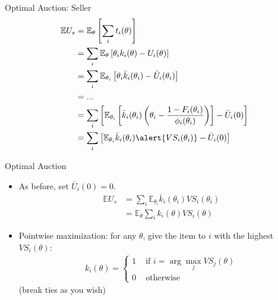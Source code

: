 \documentclass[english,10pt
,aspectratio=169
]{beamer}
\begin{document}
\begin{frame}{Optimal Auction: Seller}
\begin{align*}
	\mathbb{E} U_s &= \mathbb{E}_\theta \left[ \sum_i t_i(\theta) \right]
	\\ &= \sum_i \mathbb{E}_{\theta} \left[ \theta_i k_i(\theta) - U_i(\theta) \right]
	\\ &= \sum_i \mathbb{E}_{\theta_i} \left[ \theta_i \bar{k}_i(\theta_i) - \bar{U}_i(\theta_i) \right]
	\\  &= ...
	\\ &= \sum_i \left[ \mathbb{E}_{\theta_i} \left[ \bar{k}_i(\theta_i) \left( \theta_i - \frac{1-F_i(\theta_i)}{\phi_i(\theta_i)} \right) \right] - \bar{U}_i(0)\right]
	\\ &= \sum_i \left[ \mathbb{E}_{\theta_i} \bar{k}_i(\theta_i) \alert{VS_i(\theta_i)} - \bar{U}_i(0) \right]
\end{align*}
\end{frame}


\begin{frame}{Optimal Auction}
\begin{itemize}
	\item As before, set $\bar{U}_i(0) = 0$.
	{\footnotesize
		\begin{align*}
			\mathbb{E} U_s &= \sum_i \mathbb{E}_{\theta_i} \bar{k}_i(\theta_i) VS_i(\theta_i)
			\\
			&= \mathbb{E}_{\theta} \sum_i k_i(\theta) VS_i(\theta)
		\end{align*}
	}
	\item Pointwise maximization: for any $\theta$, give the item to $i$ with the highest $VS_i(\theta)$:
	\begin{align*}
		k_i(\theta) = 
		\begin{cases}
			1 & \text{ if } i = \arg \max_j VS_j(\theta)
			\\
			0 & \text { otherwise}
		\end{cases}
	\end{align*}
	(break ties as you wish)
\end{itemize}
\end{frame}
\end{document}
